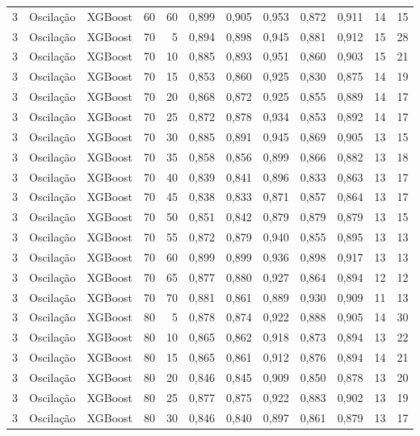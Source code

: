 \begin{longtable}{@{}rllrrrrrrrrr@{}}
3 & Oscilação & XGBoost & 60 & 60 & 0,899 & 0,905 & 0,953 & 0,872 & 0,911 & 14 & 15 \\
3 & Oscilação & XGBoost & 70 & 5 & 0,894 & 0,898 & 0,945 & 0,881 & 0,912 & 15 & 28 \\
3 & Oscilação & XGBoost & 70 & 10 & 0,885 & 0,893 & 0,951 & 0,860 & 0,903 & 15 & 21 \\
3 & Oscilação & XGBoost & 70 & 15 & 0,853 & 0,860 & 0,925 & 0,830 & 0,875 & 14 & 19 \\
3 & Oscilação & XGBoost & 70 & 20 & 0,868 & 0,872 & 0,925 & 0,855 & 0,889 & 14 & 17 \\
3 & Oscilação & XGBoost & 70 & 25 & 0,872 & 0,878 & 0,934 & 0,853 & 0,892 & 14 & 17 \\
3 & Oscilação & XGBoost & 70 & 30 & 0,885 & 0,891 & 0,945 & 0,869 & 0,905 & 13 & 15 \\
3 & Oscilação & XGBoost & 70 & 35 & 0,858 & 0,856 & 0,899 & 0,866 & 0,882 & 13 & 18 \\
3 & Oscilação & XGBoost & 70 & 40 & 0,839 & 0,841 & 0,896 & 0,833 & 0,863 & 13 & 17 \\
3 & Oscilação & XGBoost & 70 & 45 & 0,838 & 0,833 & 0,871 & 0,857 & 0,864 & 13 & 17 \\
3 & Oscilação & XGBoost & 70 & 50 & 0,851 & 0,842 & 0,879 & 0,879 & 0,879 & 13 & 15 \\
3 & Oscilação & XGBoost & 70 & 55 & 0,872 & 0,879 & 0,940 & 0,855 & 0,895 & 13 & 13 \\
3 & Oscilação & XGBoost & 70 & 60 & 0,899 & 0,899 & 0,936 & 0,898 & 0,917 & 13 & 13 \\
3 & Oscilação & XGBoost & 70 & 65 & 0,877 & 0,880 & 0,927 & 0,864 & 0,894 & 12 & 12 \\
3 & Oscilação & XGBoost & 70 & 70 & 0,881 & 0,861 & 0,889 & 0,930 & 0,909 & 11 & 13 \\
3 & Oscilação & XGBoost & 80 & 5 & 0,878 & 0,874 & 0,922 & 0,888 & 0,905 & 14 & 30 \\
3 & Oscilação & XGBoost & 80 & 10 & 0,865 & 0,862 & 0,918 & 0,873 & 0,894 & 13 & 22 \\
3 & Oscilação & XGBoost & 80 & 15 & 0,865 & 0,861 & 0,912 & 0,876 & 0,894 & 14 & 21 \\
3 & Oscilação & XGBoost & 80 & 20 & 0,846 & 0,845 & 0,909 & 0,850 & 0,878 & 13 & 20 \\
3 & Oscilação & XGBoost & 80 & 25 & 0,877 & 0,875 & 0,922 & 0,883 & 0,902 & 13 & 19 \\
3 & Oscilação & XGBoost & 80 & 30 & 0,846 & 0,840 & 0,897 & 0,861 & 0,879 & 13 & 17 \\

\end{longtable}
